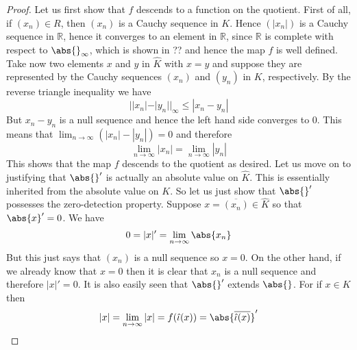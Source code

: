 \documentclass{article}
\newcommand{\mbb}[1]{\mathbb{#1}}
\numberwithin{equation}{section}
\begin{document}
\begin{proof}
    Let us first show that $f$ descends to a function on the quotient. First of all, if $(x_n) \in R$, then $(x_n)$ is a Cauchy sequence in $K$. Hence  $(|x_n|)$ is a Cauchy sequence in $\mbb R$, hence it converges to an element in $\mbb R$, since $\mbb R$ is complete with respect to $\abs{}_\infty$, which is shown in ?? and hence the map $f$ is well defined. Take now two elements $x$ and $y$ in $\hat K$ with $x = y$ and suppose they are represented by the Cauchy sequences $(x_n)$ and $(y_n)$ in $K$, respectively. By the reverse triangle inequality we have
    $$||x_n| - |y_n| |_\infty \leq |x_n - y_n|$$
    But $x_n - y_n$ is a null sequence and hence the left hand side converges to 0. This means that $\lim_{n \to \infty} (|x_n| - |y_n|) = 0$ and therefore $$\lim_{n \to \infty} |x_n| = \lim_{n \to \infty}|y_n|$$
    This shows that the map $f$ descends to the quotient as desired.
    Let us move on to justifying that $\abs{}'$ is actually an absolute value on $\hat K$. This is essentially inherited from the absolute value on $K$. So let us just show that $\abs{}'$ possesses the zero-detection property. Suppose $x = \overline {(x_n)} \in \hat K$ so that $\abs{x}' = 0$. We have
    $$0 = |x|' = \lim_{n \to \infty} \abs{x_n}$$
    But this just says that $(x_n)$ is a null sequence so $x = 0$. On the other hand, if we already know that $x = 0$ then it is clear that $x_n$ is a null sequence and therefore $|x|' = 0$. It is also easily seen that $\abs{}'$ extends $\abs{}$. For if $x \in K$ then
    $$|x| = \lim_{n \to \infty} |x| = f(\hat \iota (x)) = \abs{\overline{ \hat \iota (x)}}'$$


\end{proof}
\end{document}

